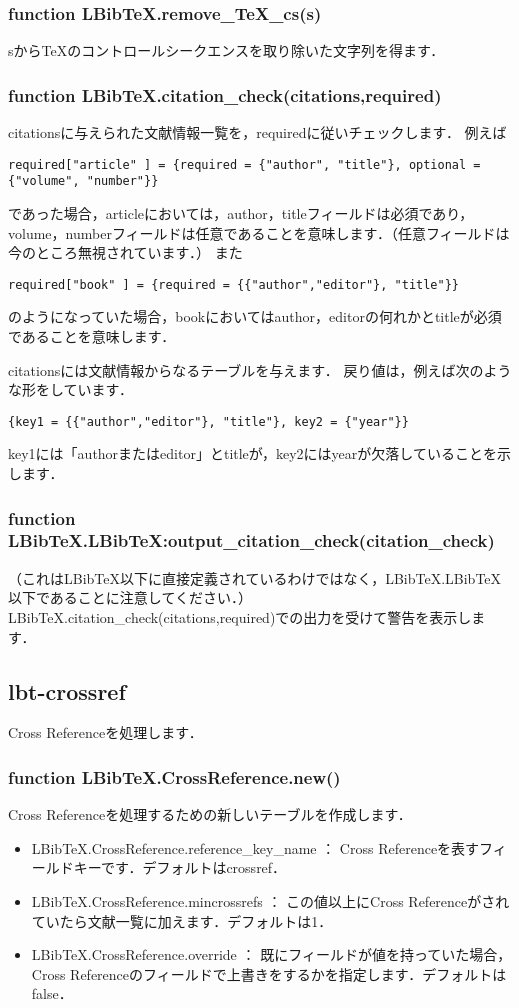 \documentclass[a4paper]{ltjsarticle}
\begin{document}
\subsubsection{function LBibTeX.remove\_TeX\_cs(s)}
sから\TeX のコントロールシークエンスを取り除いた文字列を得ます．

\subsubsection{function LBibTeX.citation\_check(citations,required)}
citationsに与えられた文献情報一覧を，requiredに従いチェックします．
例えば
\begin{lstlisting}
required["article" ] = {required = {"author", "title"}, optional = {"volume", "number"}}
\end{lstlisting}
であった場合，articleにおいては，author，titleフィールドは必須であり，volume，numberフィールドは任意であることを意味します．（任意フィールドは今のところ無視されています．）
また
\begin{lstlisting}
required["book" ] = {required = {{"author","editor"}, "title"}}
\end{lstlisting}
のようになっていた場合，bookにおいてはauthor，editorの何れかとtitleが必須であることを意味します．

citationsには文献情報からなるテーブルを与えます．
戻り値は，例えば次のような形をしています．
\begin{lstlisting}
{key1 = {{"author","editor"}, "title"}, key2 = {"year"}}
\end{lstlisting}
key1には「authorまたはeditor」とtitleが，key2にはyearが欠落していることを示します．

\subsubsection{function LBibTeX.LBibTeX:output\_citation\_check(citation\_check)}
（これはLBibTeX以下に直接定義されているわけではなく，LBibTeX.LBibTeX以下であることに注意してください．）
LBibTeX.citation\_check(citations,required)での出力を受けて警告を表示します．

\subsection{lbt-crossref}
Cross Referenceを処理します．

\subsubsection{function LBibTeX.CrossReference.new()}
Cross Referenceを処理するための新しいテーブルを作成します．
\begin{itemize}
\item LBibTeX.CrossReference.reference\_key\_name ： Cross Referenceを表すフィールドキーです．デフォルトはcrossref．
\item LBibTeX.CrossReference.mincrossrefs ： この値以上にCross Referenceがされていたら文献一覧に加えます．デフォルトは1．
\item LBibTeX.CrossReference.override ： 既にフィールドが値を持っていた場合，Cross Referenceのフィールドで上書きをするかを指定します．デフォルトはfalse．
\end{itemize}
\end{document}
